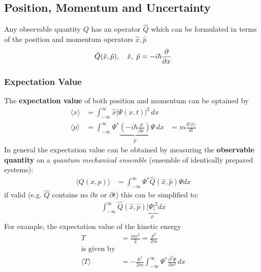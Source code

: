 \subsection{Position, Momentum and Uncertainty}
Any observable quantity $Q$ has an operator $\hat{Q}$ which can be formulated in terms of the position and momentum operators $\hat{x}, \hat{p}$
\begin{equation*}
    \hat{Q}(\hat{x},\hat{p}), \hspace*{10pt} \hat{x},\; \hat{p}=-i\hbar \frac{\partial}{\partial x}
\end{equation*}


\subsubsection{Expectation Value}
The \textbf{expectation value} of both position and momentum can be optained by
\begin{align*}
    \langle x \rangle & = \int_{-\infty}^{\infty} \hat{x} |\Psi(x,t)|^2 \, dx                                                                                                         \\
    \langle p \rangle & = \int_{-\infty}^{\infty} \Psi^* \underbrace{\left(-i\hbar \frac{\partial}{\partial x}\right)}_{\hat{p}} \Psi \, dx & = m \frac{d\langle x \rangle}{dt}
\end{align*}
In general the expectation value can be obtained by measuring the \textbf{observable quantity} on a \textit{quantum mechanical ensemble} (ensemble of identically prepared systems):
\begin{align*}
    \langle Q(x,p)\rangle & = \int_{-\infty}^{\infty}\Psi^*\hat{Q}(\hat{x},\hat{p})\Psi dx
\end{align*}
if valid (e.g. $\hat{Q}$ contains no $\partial{x}$ or $\partial{t}$) this can be simplified to:\\
\begin{align*}
    \int_{-\infty}^{\infty}\hat{Q}(\hat{x},\hat{p}) \underbrace{|\Psi|^2}_{\rho} dx
\end{align*}
For example, the expectation value of the kinetic energy
\begin{align*}
    T                 & =\frac{mv^2}{2}=\frac{p^2}{2m}                                                             \\
    \text{is given by}                                                                                             \\
    \langle T \rangle & = -\frac{\hbar^2}{2m}\int_{-\infty}^{\infty}\Psi^*\frac{\partial^2\Psi}{\partial x^2} \,dx
\end{align*}

